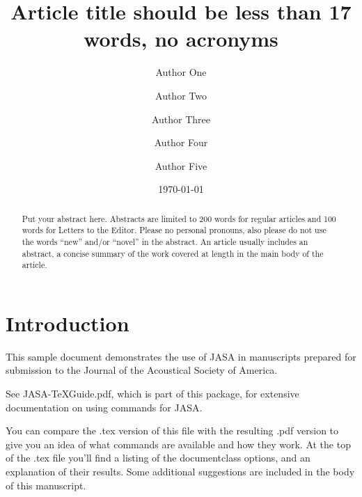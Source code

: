 \documentclass[preprint,trackchanges]{JASA}
\begin{document}
\title[JASA/Sample JASA Article]{Article title should be less than 17 words, no acronyms}
\author{Author One}
\author{Author Two}
\author{Author Three}

\author{Author Four}
 
\author{Author Five}			


\date{\today} 

\begin{abstract}
Put your abstract here. Abstracts are limited to 200 words for
regular articles and 100 words for Letters to the Editor. Please no
personal pronouns, also please do not use the words ``new'' and/or
``novel'' in the abstract. An article usually includes an abstract, a
concise summary of the work covered at length in the main body of the
article.     
\end{abstract}


\maketitle



\section{\label{sec:1} Introduction}
This sample document demonstrates the use of JASA in manuscripts 
prepared for submission to the Journal of the Acoustical Society of America. 

See JASA-TeXGuide.pdf, which is part of this package, for extensive
documentation on using commands for JASA.

You can compare the .tex version of this file with the resulting .pdf
version to give you an idea of what  commands are available and how
they work. At the top of the .tex file you'll find a listing of the
documentclass options, and an explanation of their results.
Some additional suggestions are included in the body of this
manuscript.  
\end{document}
